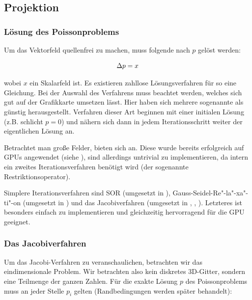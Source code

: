 
\subsection{Projektion}

\subsubsection{Lösung des Poissonproblems}

Um das Vektorfeld quellenfrei zu machen, muss folgende
 nach $p$ gelöst werden:

\begin{equation}
\Delta{p} = x
\end{equation}

wobei $x$ ein Skalarfeld ist. Es existieren zahllose Lösungsverfahren für so
eine Gleichung. Bei der Auswahl des Verfahrens muss beachtet werden, welches
sich gut auf der Grafikkarte umsetzen lässt. Hier haben sich mehrere sogenannte
 als günstig herausgestellt. Verfahren
dieser Art beginnen mit einer initialen Lösung (z.B. schlicht $p=0$) und nähern
sich dann in jedem Iterationsschritt weiter der eigentlichen Lösung an.

Betrachtet man große Felder, bieten sich 
an. Diese wurde bereits erfolgreich auf GPUs angewendet (siehe \cite{Bolz2002}),
sind allerdings untrivial zu implementieren, da intern ein zweites
Iterationsverfahren benötigt wird (der sogenannte Restriktionsoperator).

Simplere Iterationsverfahren sind SOR (umgesetzt in \cite{Saltvik2006}),
Gauss-Seidel-Re"-la"-xa"-ti"-on (umgesetzt in \cite{Stam2003}) und das
Jacobiverfahren (umgesetzt in \cite{Crane2007}, \cite{Harris2008},
\cite{Peschel2009}). Letzteres ist besonders einfach zu
implementieren und gleichzeitig hervorragend für die GPU geeignet.

\subsubsection{Das Jacobiverfahren}

Um das Jacobi-Verfahren zu veranschaulichen, betrachten wir das eindimensionale
Problem. Wir betrachten also kein diskretes 3D-Gitter, sondern eine Teilmenge
der ganzen Zahlen. Für die exakte Lösung $p$ des Poissonproblems muss an jeder
Stelle $p_i$ gelten (Randbedingungen werden später behandelt):

